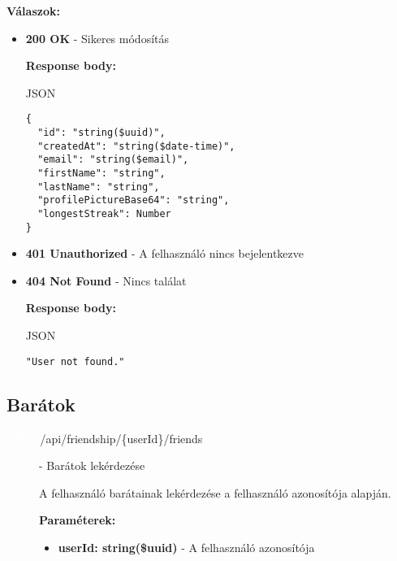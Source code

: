 \documentclass[12pt]{report}
\newcommand{\httpGet}[1]{\colorbox{getColor}{\textbf{\textcolor{white}{GET}}}~#1}
\begin{document}
\begin{itemize}
\begin{description}
    \vspace{0.5cm}
    \textbf{Válaszok:}
    \begin{itemize}
      \item \textbf{200 OK} - Sikeres módosítás

        \textbf{Response body:}
        \begin{codeblock}{JSON}
          \begin{verbatim}
{
  "id": "string($uuid)",
  "createdAt": "string($date-time)",
  "email": "string($email)",
  "firstName": "string",
  "lastName": "string",
  "profilePictureBase64": "string",
  "longestStreak": Number
}
          \end{verbatim}
        \end{codeblock}

      \item \textbf{401 Unauthorized} - A felhasználó nincs bejelentkezve

      \item \textbf{404 Not Found} - Nincs találat

        \textbf{Response body:}
        \begin{codeblock}{JSON}
          \begin{verbatim}
"User not found."
          \end{verbatim}
        \end{codeblock}
    \end{itemize}

\end{description}

\subsection{Barátok}
\begin{description}
  \item[\httpGet{/api/friendship/\{userId\}/friends}] - Barátok lekérdezése

    \vspace{0.5cm}
    A felhasználó barátainak lekérdezése a felhasználó azonosítója alapján.

    \vspace{0.5cm}
    \textbf{Paraméterek:}
    \begin{itemize}
      \item \textbf{userId: string(\$uuid)} - A felhasználó azonosítója
    \end{itemize}


\end{description}
\end{itemize}
\end{document}

